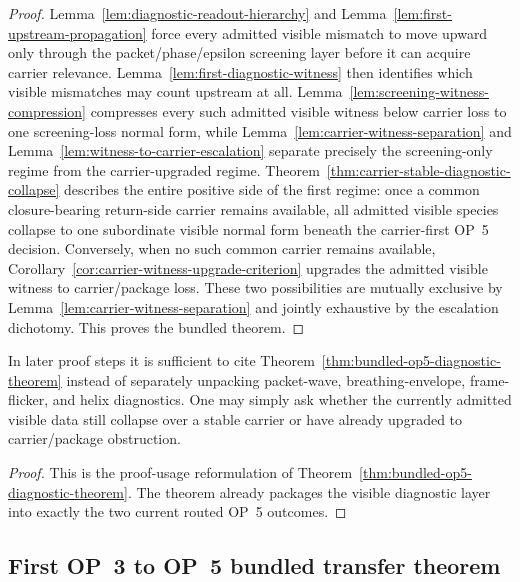 \begin{proof}
Lemma~\ref{lem:diagnostic-readout-hierarchy} and Lemma~\ref{lem:first-upstream-propagation} force every admitted visible mismatch to move upward only through the packet/phase/epsilon screening layer before it can acquire carrier relevance. Lemma~\ref{lem:first-diagnostic-witness} then identifies which visible mismatches may count upstream at all. Lemma~\ref{lem:screening-witness-compression} compresses every such admitted visible witness below carrier loss to one screening-loss normal form, while Lemma~\ref{lem:carrier-witness-separation} and Lemma~\ref{lem:witness-to-carrier-escalation} separate precisely the screening-only regime from the carrier-upgraded regime. Theorem~\ref{thm:carrier-stable-diagnostic-collapse} describes the entire positive side of the first regime: once a common closure-bearing return-side carrier remains available, all admitted visible species collapse to one subordinate visible normal form beneath the carrier-first OP~5 decision. Conversely, when no such common carrier remains available, Corollary~\ref{cor:carrier-witness-upgrade-criterion} upgrades the admitted visible witness to carrier/package loss. These two possibilities are mutually exclusive by Lemma~\ref{lem:carrier-witness-separation} and jointly exhaustive by the escalation dichotomy. This proves the bundled theorem.
\end{proof}

\begin{corollary}
\label{cor:bundled-routed-op5-diagnostic-use-rule}
In later proof steps it is sufficient to cite Theorem~\ref{thm:bundled-op5-diagnostic-theorem} instead of separately unpacking packet-wave, breathing-envelope, frame-flicker, and helix diagnostics. One may simply ask whether the currently admitted visible data still collapse over a stable carrier or have already upgraded to carrier/package obstruction.
\end{corollary}

\begin{proof}
This is the proof-usage reformulation of Theorem~\ref{thm:bundled-op5-diagnostic-theorem}. The theorem already packages the visible diagnostic layer into exactly the two current routed OP~5 outcomes.
\end{proof}


\subsection{First OP~3 to OP~5 bundled transfer theorem}
\label{sec:first-op3-op5-bundled-transfer}

